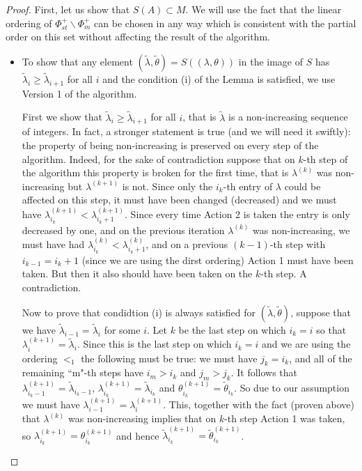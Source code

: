 \documentclass[10pt,a4paper]{amsart}
\begin{document}
\begin{proof}
    First, let us show that $S(A)\subset M$. We will use the fact that the linear ordering of $\Phi^+_{st}\backslash \Phi^+_m$ can be chosen in any way which is consistent with the partial order on this set without affecting the result of the algorithm.
    \begin{itemize}
        \item To show that any element $(\tilde\lambda,\tilde\theta)=S\left( (\lambda,\theta)\right)$ in the image of $S$ has $\tilde\lambda_{i} \ge \tilde\lambda_{i+1}$ for all $i$  and the condition (i) of the Lemma is satisfied, we use Version 1 of the algorithm.

        First we show that $\tilde\lambda_{i} \ge \tilde\lambda_{i+1}$ for all $i$, that is $\tilde\lambda$ is a non-increasing sequence of integers. In fact, a stronger statement is true (and we will need it swiftly): the property of being non-increasing is preserved on every step of the algorithm. Indeed, for the sake of contradiction suppose that on $k$-th step of the algorithm this property is broken for the first time, that is $\lambda^{(k)}$ was non-increasing but $\lambda^{(k+1)}$ is not. Since only the $i_k$-th entry of $\lambda$ could be affected on this step, it must have been changed (decreased) and we must have $\lambda^{(k+1)}_{i_k}<\lambda^{(k+1)}_{i_k+1}$. Since every time Action 2 is taken the entry is only decreased by one, and on the previous iteration $\lambda^{(k)}$ was non-increasing, we must have had $\lambda^{(k)}_{i_k}<\lambda^{(k)}_{i_k+1}$, and on a previous $(k-1)$-th step with $i_{k-1}=i_k+1$ (since we are using the dirst ordering) Action 1 must have been taken. But then it also should have been taken on the $k$-th step. A contradiction.

         Now to prove that condidtion (i) is always satisfied for $(\tilde\lambda,\tilde\theta)$, suppose that we have $\tilde\lambda_{i-1} =\tilde\lambda_{i}$ for some $i$. Let $k$ be the last step on which $i_k=i$ so that $\lambda^{(k+1)}_{i}=\tilde\lambda_{i}$. Since this is the last step on which $i_k=i$ and we are using the ordering $<_1$ the following must be true: we must have $j_k=i_k$, and all of the remaining ``m"-th steps have $i_m>i_k$ and $j_m>j_k$. It follows that $\lambda_{i_k-1}^{(k+1)}= \tilde\lambda_{i_k-1}$, $\lambda_{i_k}^{(k+1)}= \tilde\lambda_{i_k}$ and $\theta_{i_k}^{(k+1)}= \tilde\theta_{i_k}$. So due to our assumption we must have $\lambda_{i-1}^{(k+1)} =\lambda_{i}^{(k+1)}$. This, together with the fact (proven above) that $\lambda^{(k)}$ was non-increasing implies that on $k$-th step Action 1 was taken, so $\lambda_{i_k}^{(k+1)}= \theta_{i_k}^{(k+1)}$ and hence $\tilde\lambda_{i_k}^{(k+1)}= \tilde\theta_{i_k}^{(k+1)}$.


\end{itemize}
\end{proof}
\end{document}
